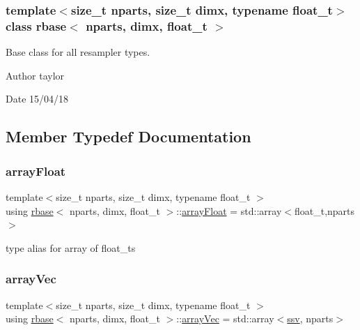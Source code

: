 \subsubsection*{template$<$size\+\_\+t nparts, size\+\_\+t dimx, typename float\+\_\+t$>$\newline
class rbase$<$ nparts, dimx, float\+\_\+t $>$}

Base class for all resampler types. 

\begin{DoxyAuthor}{Author}
taylor 
\end{DoxyAuthor}
\begin{DoxyDate}{Date}
15/04/18 
\end{DoxyDate}


\subsection{Member Typedef Documentation}
\mbox{\label{classrbase_a6f76bef853e508cb5b6f546d231b06f5}} 
\subsubsection{\texorpdfstring{array\+Float}{arrayFloat}}
{\footnotesize\ttfamily template$<$size\+\_\+t nparts, size\+\_\+t dimx, typename float\+\_\+t $>$ \\
using \hyperlink{classrbase}{rbase}$<$ nparts, dimx, float\+\_\+t $>$\+::\hyperlink{classrbase_a6f76bef853e508cb5b6f546d231b06f5}{array\+Float} =  std\+::array$<$float\+\_\+t,nparts$>$}

type alias for array of float\+\_\+ts \mbox{\label{classrbase_aa12fc826befa6ba0647b5f59ebc396ee}} 
\subsubsection{\texorpdfstring{array\+Vec}{arrayVec}}
{\footnotesize\ttfamily template$<$size\+\_\+t nparts, size\+\_\+t dimx, typename float\+\_\+t $>$ \\
using \hyperlink{classrbase}{rbase}$<$ nparts, dimx, float\+\_\+t $>$\+::\hyperlink{classrbase_aa12fc826befa6ba0647b5f59ebc396ee}{array\+Vec} =  std\+::array$<$\hyperlink{classrbase_ae20e0b8df15aa109252f57ecbf1f20f8}{ssv}, nparts$>$}

